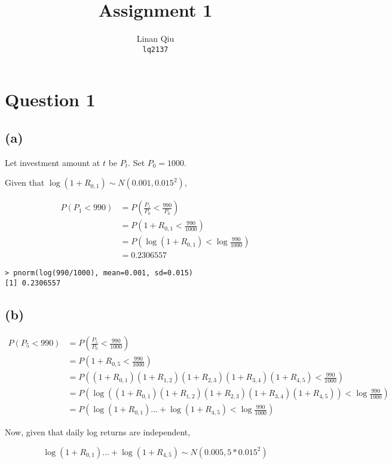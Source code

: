 \documentclass[11pt]{scrartcl}
\title{Assignment 1}
\author{Linan Qiu\\\texttt{lq2137}}
\begin{document}
\maketitle

\section*{Question 1}
\subsection*{(a)}

Let investment amount at $t$ be $P_t$. Set $P_0 = 1000$.

Given that $\log{(1+R_{0,1})} \sim N(0.001, 0.015^2)$,

\begin{align*}
P(P_1 < 990) &= P\left(\frac{P_1}{P_0} < \frac{990}{P_0}\right) \\
&= P\left( 1 + R_{0,1} < \frac{990}{1000} \right) \\
&= P\left( \log{(1 + R_{0,1})} < \log{\frac{990}{1000}}\right) \\
&= 0.2306557
\end{align*}

\begin{lstlisting}
> pnorm(log(990/1000), mean=0.001, sd=0.015)
[1] 0.2306557
\end{lstlisting}

\subsection*{(b)}
\begin{align*}
P(P_5 < 990) &= P\left(\frac{P_5}{P_0} < \frac{990}{1000} \right) \\
&= P\left(1 + R_{0,5} < \frac{990}{1000} \right) \\
&= P\left((1 + R_{0,1})(1 + R_{1,2})(1+R_{2,3})(1+R_{3,4})(1+R_{4,5}) < \frac{990}{1000} \right) \\
&= P\left(\log{\left((1 + R_{0,1})(1 + R_{1,2})(1+R_{2,3})(1+R_{3,4})(1+R_{4,5})\right)} < \log{\frac{990}{1000}} \right) \\
&= P\left(\log{(1+R_{0,1})} ... + \log{(1+R_{4,5})} < \log{\frac{990}{1000}} \right)
\end{align*}

Now, given that daily log returns are independent,

\[\log{(1+R_{0,1})} ... + \log{(1+R_{4,5})} \sim N(0.005, 5 * 0.015^2)\]
\end{document}
